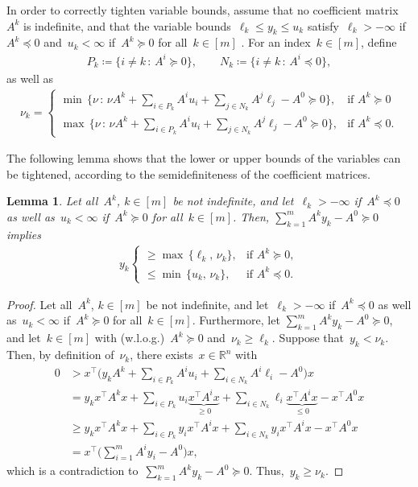 \documentclass[10pt, a4paper]{article}
\newcommand{\suchthat}{\,:\,}
\newcommand{\define}{\coloneqq}
\newcommand{\T}{^{\top}}
\newcommand{\R}{\mathds{R}}
\newtheorem{lemma}[theorem]{Lemma}
\begin{document}
In order to correctly tighten variable bounds, assume that no coefficient
matrix~$A^k$ is indefinite, and that the variable
bounds~$\ell_k \leq y_k \leq u_k$ satisfy~$\ell_k >-\infty$
if~$A^k \preceq 0$ and~$u_k < \infty$ if~$A^k \succeq 0$ for
all~$k \in [m]$ . For an index~$k \in [m]$, define
\begin{align*}
  P_k \define \{i \neq k \suchthat A^i \succeq 0\},\qquad N_k \define \{i
  \neq k \suchthat A^i \preceq 0\},
\end{align*}
as well as
\begin{align*}
  \nu_k =
  \begin{cases}
    \min\, \{\nu \suchthat \nu A^k + \sum_{i\in P_k}A^i u_i + \sum_{j
      \in N_k} A^j \ell_j - A^0 \succeq 0 \}, & \text{if } A^k \succeq 0 \\
    \max\, \{\nu \suchthat \nu A^k + \sum_{i\in P_k}A^i u_i + \sum_{j
      \in N_k} A^j \ell_j - A^0 \succeq 0 \}, & \text{if } A^k \preceq 0.
  \end{cases}
\end{align*}

The following lemma shows that the lower or upper bounds of the variables
can be tightened, according to the semidefiniteness of the coefficient
matrices.
\begin{lemma}
  Let all~$A^k$, $k \in [m]$ be not indefinite, and let~$\ell_k >-\infty$
  if~$A^k \preceq 0$ as well as~$u_k < \infty$ if~$A^k \succeq 0$ for
  all~$k \in [m]$. Then, $\sum_{k=1}^m A^k y_k - A^0 \succeq 0$ implies
  \begin{align*}
    y_k
    \begin{cases}
      \geq \max \, \{\ell_k,\, \nu_k\}, & \text{if } A^k \succeq 0, \\
      \leq \min \, \{u_k,\, \nu_k\}, & \text{if } A^k \preceq 0.
    \end{cases}
  \end{align*}
\end{lemma}

\begin{proof}
  Let all~$A^k$, $k \in [m]$ be not indefinite, and let~$\ell_k >-\infty$
  if~$A^k \preceq 0$ as well as~$u_k < \infty$ if~$A^k \succeq 0$ for
  all~$k \in [m]$. Furthermore, let $\sum_{k=1}^m A^k y_k - A^0 \succeq 0$,
  and let~$k \in [m]$ with (w.l.o.g.)~$A^k \succeq 0$ and~$\nu_k \geq \ell_k$. Suppose
  that~$y_k < \nu_k$. Then, by definition of~$\nu_k$, there
  exists~$x \in \R^n$ with
  \begin{align*}
    0 &> x\T \Big(y_kA^k + \sum_{i \in P_k}A^i u_i + \sum_{i\in N_k}A^i
        \ell_i - A^0 \Big) x \\
      &= y_k x\T A^k x + \sum_{i \in P_k} u_i \underbrace{x\T A^i x}_{\geq 0} + \sum_{i\in N_k}
        \ell_i \underbrace{x\T A^i x}_{\leq 0} - x\T A^0 x \\
      &\geq y_k x\T A^k x + \sum_{i \in P_k} y_i x\T A^i x + \sum_{i\in N_k}
        y_i x\T A^i x - x\T A^0 x \\
      &= x\T \Big(\sum_{i=1}^m A^i y_i - A^0\Big) x,
  \end{align*}
  which is a contradiction to~$\sum_{k=1}^m A^k y_k - A^0 \succeq
  0$. Thus,~$y_k \geq \nu_k$.
\end{proof}
\end{document}

